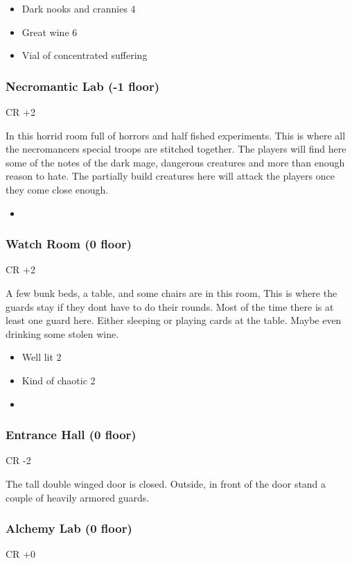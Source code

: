 \documentclass[11pt]{article}
\begin{document}
{\begin{itemize}
\item Dark nooks and crannies 4
\item Great wine 6
\item Vial of concentrated suffering
\end{itemize}
\subsubsection{Necromantic Lab (-1 floor)}
\label{sec:org284ef13}
CR +2

In this horrid room full of horrors and half fished experiments. This is where all the necromancers special troops are stitched together. The players will find here some of the notes of the dark mage, dangerous creatures and more than enough reason to hate. The partially build creatures here will attack the players once they come close enough.

\begin{itemize}
\item 
\end{itemize}
\subsubsection{Watch Room (0 floor)}
\label{sec:orge913e25}
CR +2

A few bunk beds, a table, and some chairs are in this room, This is where the guards stay if they dont have to do their rounds. Most of the time there is at least one guard here. Either sleeping or playing cards at the table. Maybe even drinking some stolen wine.

\begin{itemize}
\item Well lit 2
\item Kind of chaotic 2
\item 
\end{itemize}
\subsubsection{Entrance Hall (0 floor)}
\label{sec:org93d673d}
CR -2

The tall double winged door is closed. Outside, in front of the door stand a couple of heavily armored guards.
\subsubsection{Alchemy Lab (0 floor)}
\label{sec:org463e7be}
CR +0

}
\end{document}
